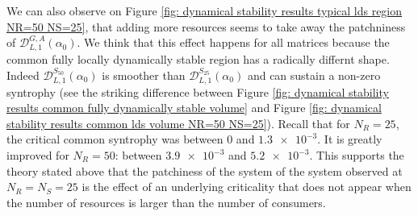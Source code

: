 \documentclass[12pt, titlepage]{report}
\begin{document}
We can also observe on Figure \ref{fig: dynamical stability results typical lds region NR=50 NS=25}, that adding more resources seems to take away the patchniness of $\mathcal{D}_{L,1}^{G,A}(\alpha_0)$. We think that this effect happens for all matrices because the common fully locally dynamically stable region has a radically differnt shape. Indeed $\mathcal{D}_{L,1}^{S_{50}}(\alpha_0)$ is smoother than $\mathcal{D}_{L,1}^{S_{25}}(\alpha_0)$ and can sustain a non-zero syntrophy (see the striking difference between Figure \ref{fig: dynamical stability results common fully dynamically stable volume} and Figure \ref{fig: dynamical stability results common lds volume NR=50 NS=25}). Recall that  for $N_R=25$, the critical common syntrophy was between $0$ and $\num{1.3e-3}$. It is greatly improved for $N_R=50$: between $\num{3.9e-3}$ and $\num{5.2e-3}$. This supports the theory stated above that the patchiness of the system of the system observed at $N_R=N_S=25$ is the effect of an underlying criticality that does not appear when the number of resources is larger than the number of consumers.
\end{document}
